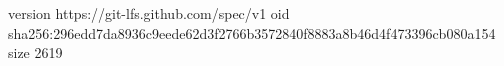 version https://git-lfs.github.com/spec/v1
oid sha256:296edd7da8936c9eede62d3f2766b3572840f8883a8b46d4f473396cb080a154
size 2619
